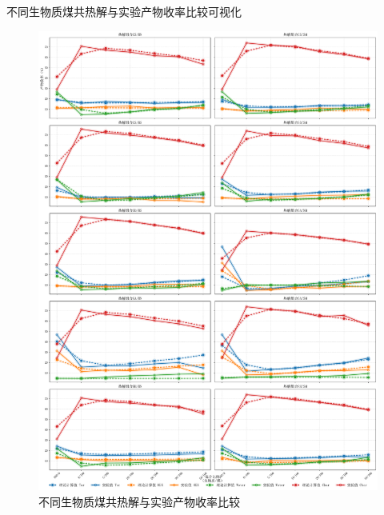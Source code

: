 \documentclass{beamer}
\begin{document}
\begin{frame}{不同生物质煤共热解与实验产物收率比较可视化}
    \begin{figure}[htbp]
    \centering
    \includegraphics[width=0.5\linewidth]{pic/comparison_plots.pdf}
    \caption{不同生物质煤共热解与实验产物收率比较}
    \label{fig:comparison_plots}
    \end{figure}
\end{frame}
\end{document}
